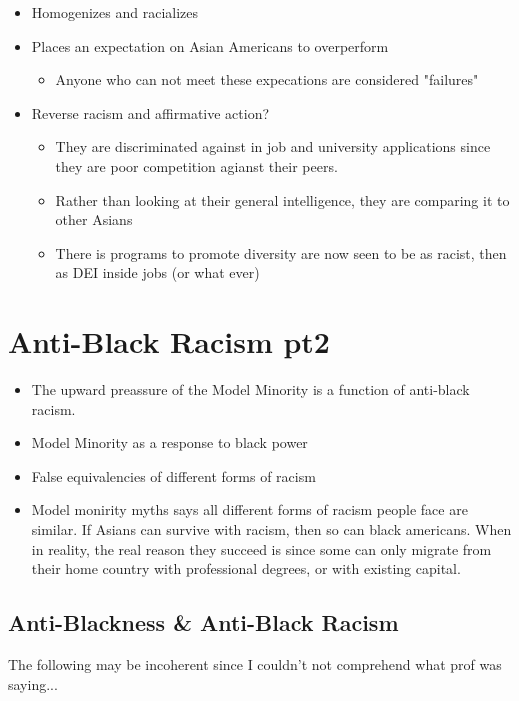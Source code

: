 \documentclass{article}
\begin{document}
\begin{itemize}
  \item Homogenizes and racializes
  \item Places an expectation on Asian Americans to overperform
    \begin{itemize}
      \item Anyone who can not meet these expecations are considered "failures"
    \end{itemize}
  \item Reverse racism and affirmative action?
    \begin{itemize}
      \item They are discriminated against in job and university applications
        since they are poor competition agianst their peers.
      \item Rather than looking at their general intelligence, they are
        comparing it to other Asians
      \item There is programs to promote diversity are now seen to be as racist,
        then as DEI inside jobs (or what ever)
    \end{itemize}
\end{itemize}

\section{Anti-Black Racism pt2}

\begin{itemize}
  \item The upward preassure of the Model Minority is a function of anti-black racism.
  \item Model Minority as a response to black power
  \item False equivalencies of different forms of racism
  \item Model monirity myths says all different forms of racism people face are similar.
    If Asians can survive with racism, then so can black americans. 
    When in reality, the real reason they succeed is since some can only
    migrate from their home country with professional degrees, or with existing capital.
\end{itemize}

\subsection{Anti-Blackness \& Anti-Black Racism}

The following may be incoherent since I couldn't not comprehend what
prof was saying...
\end{document}
